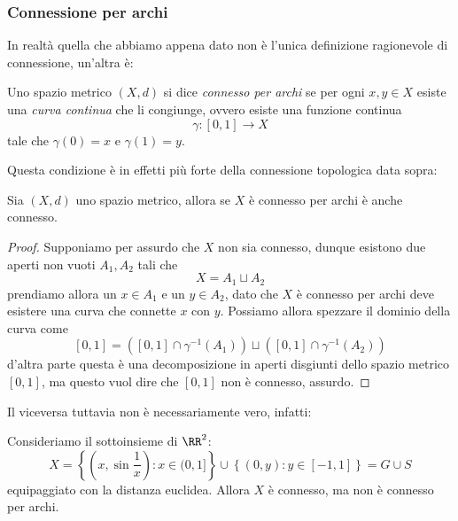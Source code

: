 \documentclass[11pt]{scrartcl}
\begin{document}
	\subsubsection{Connessione per archi}
	In realtà quella che abbiamo appena dato non è l'unica definizione ragionevole di connessione, un'altra è:
	\begin{definition}
		Uno spazio metrico $(X,d)$ si dice \textit{connesso per archi} se per ogni $x,y\in X$ esiste una \textit{curva continua} che li congiunge, ovvero esiste una funzione continua
		$$\gamma:[0,1]\to X$$
		tale che $\gamma(0)=x$ e $\gamma(1)=y$.
	\end{definition}
	Questa condizione è in effetti più forte della connessione topologica data sopra:
	\begin{theorem}
		Sia $(X,d)$ uno spazio metrico, allora se $X$ è connesso per archi è anche connesso.
	\end{theorem}
	\begin{proof}
		Supponiamo per assurdo che $X$ non sia connesso, dunque esistono due aperti non vuoti $A_1,A_2$ tali che
		$$X=A_1\sqcup A_2$$
		prendiamo allora un $x\in A_1$ e un $y\in A_2$, dato che $X$ è connesso per archi deve esistere una curva che connette $x$ con $y$. Possiamo allora spezzare il dominio della curva come
		$$[0,1]=\left([0,1]\cap \gamma^{-1}(A_1)\right)\sqcup \left([0,1]\cap \gamma^{-1}(A_2)\right)$$
		d'altra parte questa è una decomposizione in aperti disgiunti dello spazio metrico $[0,1]$, ma questo vuol dire che $[0,1]$ non è connesso, assurdo.
	\end{proof}
	Il viceversa tuttavia non è necessariamente vero, infatti:
	\begin{example}
		Consideriamo il sottoinsieme di $\RR^2$:
		$$X=\left\{\left(x,\sin\frac{1}{x}\right): x\in (0,1]\right\}\cup \left\{\left(0,y\right):y\in [-1,1]\right\}=G\cup S$$
		equipaggiato con la distanza euclidea. Allora $X$ è connesso, ma non è connesso per archi.
	\end{example}
\end{document}
